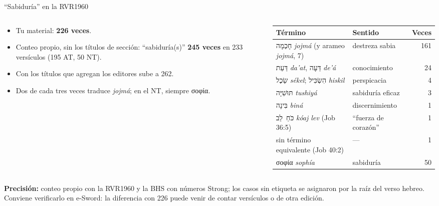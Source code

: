 \documentclass[hyperref={bookmarks=false},aspectratio=169]{beamer}
\newcommand{\heb}[1]{\mbox{\foreignlanguage{hebrew}{#1}}}
\newcommand{\grc}[1]{\foreignlanguage{ancientgreek}{#1}}
\newcommand{\destacar}[1]{\textbf{\textcolor{azul}{#1}}}
\newcommand{\precision}[1]{{\footnotesize\color{gris}\textbf{Precisión:} #1}}
\begin{document}
\begin{frame}{``Sabiduría'' en la RVR1960}
\begin{columns}[c,onlytextwidth]
\begin{column}{0.40\textwidth}\footnotesize
\begin{itemize}
\item Tu material: \destacar{226 veces}.
\item Conteo propio, sin los títulos de sección: ``sabiduría(s)'' \textbf{245 veces} en 233 versículos (195 AT, 50 NT).
\item Con los títulos que agregan los editores sube a 262.
\item Dos de cada tres veces traduce \emph{jojmá}; en el NT, siempre \grc{σοφία}.
\end{itemize}
\end{column}
\begin{column}{0.58\textwidth}
\scriptsize\renewcommand{\arraystretch}{1.12}
\begin{tabular}{@{}>{\RaggedRight\arraybackslash}p{3.4cm}>{\RaggedRight\arraybackslash}p{2.4cm}r@{}}
\toprule
\textbf{Término} & \textbf{Sentido} & \textbf{Veces} \\ \midrule
\heb{חָכְמָה} \emph{jojmá} (y arameo \emph{jojmá}, 7) & destreza sabia & 161 \\
\heb{דַּעַת} \emph{da'at}, \heb{דֵּעָה} \emph{de'á} & conocimiento & 24 \\
\heb{שֵׂכֶל} \emph{sékel}; \heb{הִשְׂכִּיל} \emph{hiskil} & perspicacia & 4 \\
\heb{תּוּשִׁיָּה} \emph{tushiyá} & sabiduría eficaz & 3 \\
\heb{בִּינָה} \emph{biná} & discernimiento & 1 \\
\heb{כֹּחַ לֵב} \emph{kóaj lev} (Job 36:5) & ``fuerza de corazón'' & 1 \\
sin término equivalente (Job 40:2) & --- & 1 \\
\grc{σοφία} \emph{sophía} & sabiduría & 50 \\
\bottomrule
\end{tabular}
\end{column}
\end{columns}\par\smallskip
\precision{conteo propio con la RVR1960 y la BHS con números Strong; los casos sin etiqueta se asignaron por la raíz del verso hebreo. Conviene verificarlo en e-Sword: la diferencia con 226 puede venir de contar versículos o de otra edición.}
\end{frame}
\end{document}
